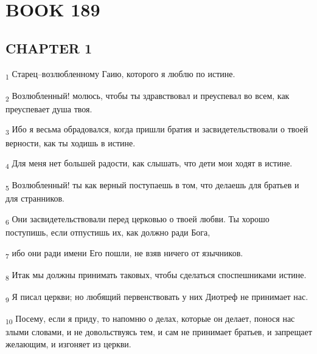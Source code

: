 \section{BOOK 189}
\subsection{CHAPTER 1}
\begin{tcolorbox}
\textsubscript{1} Старец--возлюбленному Гаию, которого я люблю по истине.
\end{tcolorbox}
\begin{tcolorbox}
\textsubscript{2} Возлюбленный! молюсь, чтобы ты здравствовал и преуспевал во всем, как преуспевает душа твоя.
\end{tcolorbox}
\begin{tcolorbox}
\textsubscript{3} Ибо я весьма обрадовался, когда пришли братия и засвидетельствовали о твоей верности, как ты ходишь в истине.
\end{tcolorbox}
\begin{tcolorbox}
\textsubscript{4} Для меня нет большей радости, как слышать, что дети мои ходят в истине.
\end{tcolorbox}
\begin{tcolorbox}
\textsubscript{5} Возлюбленный! ты как верный поступаешь в том, что делаешь для братьев и для странников.
\end{tcolorbox}
\begin{tcolorbox}
\textsubscript{6} Они засвидетельствовали перед церковью о твоей любви. Ты хорошо поступишь, если отпустишь их, как должно ради Бога,
\end{tcolorbox}
\begin{tcolorbox}
\textsubscript{7} ибо они ради имени Его пошли, не взяв ничего от язычников.
\end{tcolorbox}
\begin{tcolorbox}
\textsubscript{8} Итак мы должны принимать таковых, чтобы сделаться споспешниками истине.
\end{tcolorbox}
\begin{tcolorbox}
\textsubscript{9} Я писал церкви; но любящий первенствовать у них Диотреф не принимает нас.
\end{tcolorbox}
\begin{tcolorbox}
\textsubscript{10} Посему, если я приду, то напомню о делах, которые он делает, понося нас злыми словами, и не довольствуясь тем, и сам не принимает братьев, и запрещает желающим, и изгоняет из церкви.
\end{tcolorbox}
